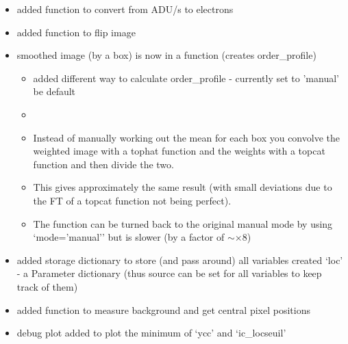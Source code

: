 \begin{itemize}

\item added function to convert from ADU/s to electrons 
    
\item added function to flip image 

\item smoothed image (by a box) is now in a function (creates order\_profile)
	\begin{itemize}
	\item added different way to calculate order\_profile - currently set to 'manual' be default
	\item {} 
	\item Instead of manually working out the mean for each box you convolve the weighted image with a tophat function and the weights with a topcat function and then divide the two.
	\item This gives approximately the same result (with small deviations due to the FT of a topcat function not being perfect).
	\item The function can be turned back to the original manual mode by using `mode='manual'' but is slower (by a factor of $\sim\times$8)
	\end{itemize}

\item added storage dictionary to store (and pass around) all variables created `loc' - a Parameter dictionary (thus source can be set for all variables to keep track of them)

\item added function to measure background and get central pixel positions 

\item debug plot added to plot the minimum of `ycc' and `ic\_locseuil' 


\end{itemize}
